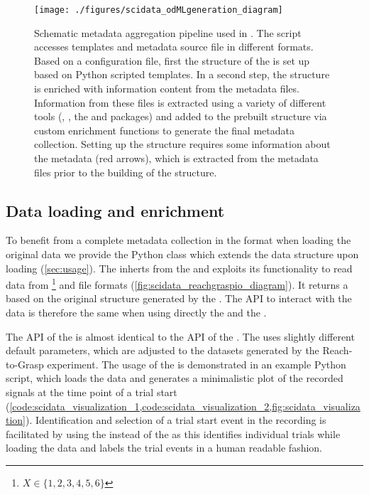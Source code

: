 \begin{figure}
 \texttt{[image: ./figures/scidata\_odMLgeneration\_diagram]}
 \caption[Schematic metadata aggregation pipeline used in \citet{Brochier_2018}]{Schematic metadata aggregation pipeline used in \citet{Brochier_2018}. The  script accesses  templates and metadata source file in different formats. Based on a configuration file, first the structure of the  is set up based on Python scripted  templates. In a second step, the structure is enriched with information content from the metadata files. Information from these files is extracted using a variety of different tools (, , the   and  packages) and added to the prebuilt  structure via custom enrichment functions to generate the final metadata collection. Setting up the  structure requires some information about the metadata (red arrows), which is extracted from the metadata files prior to the building of the  structure.}
 \label{fig:scidata_metadata_pipeline}
\end{figure}

\subsection{Data loading and enrichment}
\label{sec:data_loading_and_enrichment}
To benefit from a complete metadata collection in the  format when loading the original data we provide the  Python class which extends the  data structure upon loading (\cref{sec:usage}). The  inherts from the   and exploits its functionality to read data from \footnote{$X \in \{1,2,3,4,5,6\}$} and  file formats (\cref{fig:scidata_reachgraspio_diagram}). It returns a   based on the original structure generated by the  . The API to interact with the data is therefore the same when using directly the   and the .

The API of the  is almost identical to the API of the . The  uses slightly different default parameters, which are adjusted to the datasets generated by the Reach-to-Grasp experiment. The usage of the  is demonstrated in an example Python script, which loads the data and generates a minimalistic plot of the recorded signals at the time point of a trial start (\cref{code:scidata_visualization_1,code:scidata_visualization_2,fig:scidata_visualization}).
Identification and selection of a trial start event in the recording is facilitated by using the  instead of the  as this identifies individual trials while loading the data and labels the trial events in a human readable fashion.


